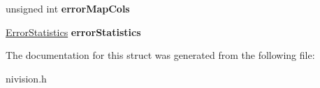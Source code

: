 \begin{DoxyCompactItemize}
\item 
\hypertarget{structGetCalibrationInfoReport__struct_a56aa5d473ceeb7df8c555b78c70b1073}{
unsigned int {\bfseries errorMapCols}}
\label{structGetCalibrationInfoReport__struct_a56aa5d473ceeb7df8c555b78c70b1073}

\item 
\hypertarget{structGetCalibrationInfoReport__struct_acd24e47f7afb0a0f3b9262f9605930b5}{
\hyperlink{structErrorStatistics__struct}{ErrorStatistics} {\bfseries errorStatistics}}
\label{structGetCalibrationInfoReport__struct_acd24e47f7afb0a0f3b9262f9605930b5}

\end{DoxyCompactItemize}


The documentation for this struct was generated from the following file:\begin{DoxyCompactItemize}
\item 
nivision.h\end{DoxyCompactItemize}
